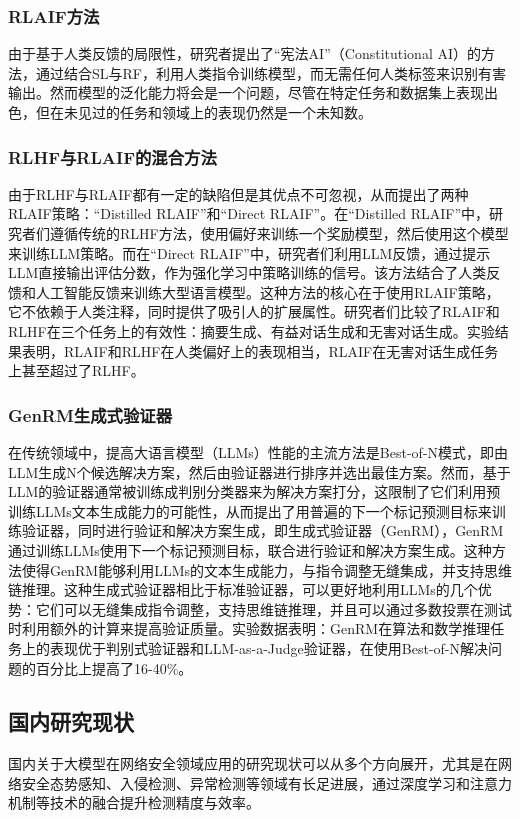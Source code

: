 \subsubsection{RLAIF方法}
由于基于人类反馈的局限性，研究者提出了“宪法AI”\cite{bai2022constitutional}（Constitutional AI）的方法，通过结合SL与RF，利用人类指令训练模型，而无需任何人类标签来识别有害输出。然而模型的泛化能力将会是一个问题，尽管在特定任务和数据集上表现出色，但在未见过的任务和领域上的表现仍然是一个未知数。
\subsubsection{RLHF与RLAIF的混合方法}
由于RLHF与RLAIF都有一定的缺陷但是其优点不可忽视，从而提出了两种RLAIF策略\cite{arXiv:2309.00267}：“Distilled RLAIF”和“Direct RLAIF”。在“Distilled RLAIF”中，研究者们遵循传统的RLHF方法，使用偏好来训练一个奖励模型，然后使用这个模型来训练LLM策略。而在“Direct RLAIF”中，研究者们利用LLM反馈，通过提示LLM直接输出评估分数，作为强化学习中策略训练的信号。该方法结合了人类反馈和人工智能反馈来训练大型语言模型。这种方法的核心在于使用RLAIF策略，它不依赖于人类注释，同时提供了吸引人的扩展属性。研究者们比较了RLAIF和RLHF在三个任务上的有效性：摘要生成、有益对话生成和无害对话生成。实验结果表明，RLAIF和RLHF在人类偏好上的表现相当，RLAIF在无害对话生成任务上甚至超过了RLHF。
\subsubsection{GenRM生成式验证器}
在传统领域中，提高大语言模型（LLMs）性能的主流方法是Best-of-N模式，即由LLM生成N个候选解决方案，然后由验证器进行排序并选出最佳方案。然而，基于LLM的验证器通常被训练成判别分类器来为解决方案打分，这限制了它们利用预训练LLMs文本生成能力的可能性，从而提出了用普遍的下一个标记预测目标来训练验证器，同时进行验证和解决方案生成，即生成式验证器\cite{zhang2024generative}（GenRM），GenRM通过训练LLMs使用下一个标记预测目标，联合进行验证和解决方案生成。这种方法使得GenRM能够利用LLMs的文本生成能力，与指令调整无缝集成，并支持思维链推理。这种生成式验证器相比于标准验证器，可以更好地利用LLMs的几个优势：它们可以无缝集成指令调整，支持思维链推理，并且可以通过多数投票在测试时利用额外的计算来提高验证质量。实验数据表明：GenRM在算法和数学推理任务上的表现优于判别式验证器和LLM-as-a-Judge验证器，在使用Best-of-N解决问题的百分比上提高了16-40\%。
\subsection{国内研究现状}
国内关于大模型在网络安全领域应用的研究现状可以从多个方向展开，尤其是在网络安全态势感知、入侵检测、异常检测等领域有长足进展，通过深度学习和注意力机制等技术的融合提升检测精度与效率。
